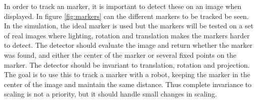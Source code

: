 In order to track an marker, it is important to detect these on an image when displayed.
In figure \ref{fig:markers} can the different markers to be tracked be seen.
In the simulation, the ideal marker is used but the markers will be tested on a set of real images where lighting, rotation and translation makes the markers harder to detect.
The detector should evaluate the image and return whether the marker was found, and either the center of the marker or several fixed points on the marker.
The detector should be invariant to translation, rotation and projection.
The goal is to use this to track a marker with a robot, keeping the marker in the center of the image and maintain the same distance.
Thus complete invariance to scaling is not a priority, but it should handle small changes in scaling.

